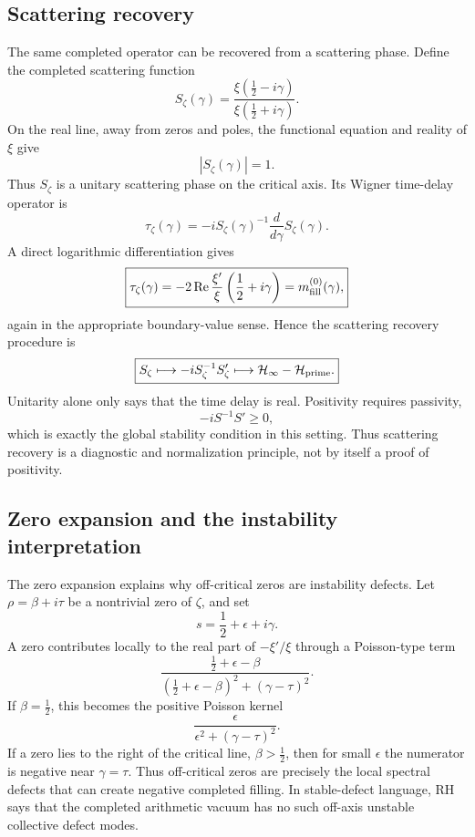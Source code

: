 \documentclass[11pt]{article}
\newcommand{\Hess}{\mathcal H}
\newcommand{\half}{\frac12}
\begin{document}
\subsection{Scattering recovery}

The same completed operator can be recovered from a scattering phase. Define the completed scattering function
\[
\boxed{
        S_\zeta(\gamma)
        =\frac{\xi(\half-i\gamma)}{\xi(\half+i\gamma)}.
}
\]
On the real line, away from zeros and poles, the functional equation and reality of $\xi$ give
\[
        |S_\zeta(\gamma)|=1.
\]
Thus $S_\zeta$ is a unitary scattering phase on the critical axis. Its Wigner time-delay operator is
\[
\boxed{
        \tau_\zeta(\gamma)
        =-iS_\zeta(\gamma)^{-1}\frac{d}{d\gamma}S_\zeta(\gamma).
}
\]
A direct logarithmic differentiation gives
\[
\boxed{
        \tau_\zeta(\gamma)
        =-2\Re\frac{\xi'}{\xi}\left(\half+i\gamma\right)
        =m_{\rm fill}^{(0)}(\gamma),
}
\]
again in the appropriate boundary-value sense. Hence the scattering recovery procedure is
\[
\boxed{
        S_\zeta
        \longmapsto
        -iS_\zeta^{-1}S_\zeta'
        \longmapsto
        \Hess_\infty-\Hess_{\rm prime}.
}
\]
Unitarity alone only says that the time delay is real. Positivity requires passivity,
\[
        -iS^{-1}S'\ge0,
\]
which is exactly the global stability condition in this setting. Thus scattering recovery is a diagnostic and normalization principle, not by itself a proof of positivity.

\subsection{Zero expansion and the instability interpretation}

The zero expansion explains why off-critical zeros are instability defects. Let $\rho=\beta+i\tau$ be a nontrivial zero of $\zeta$, and set
\[
        s=\half+\epsilon+i\gamma.
\]
A zero contributes locally to the real part of $-\xi'/\xi$ through a Poisson-type term
\[
\boxed{
        \frac{\half+\epsilon-\beta}
        {(\half+\epsilon-\beta)^2+(\gamma-\tau)^2}.
}
\]
If $\beta=\half$, this becomes the positive Poisson kernel
\[
        \frac{\epsilon}{\epsilon^2+(\gamma-\tau)^2}.
\]
If a zero lies to the right of the critical line, $\beta>\half$, then for small $\epsilon$ the numerator is negative near $\gamma=\tau$. Thus off-critical zeros are precisely the local spectral defects that can create negative completed filling. In stable-defect language, RH says that the completed arithmetic vacuum has no such off-axis unstable collective defect modes.
\end{document}
